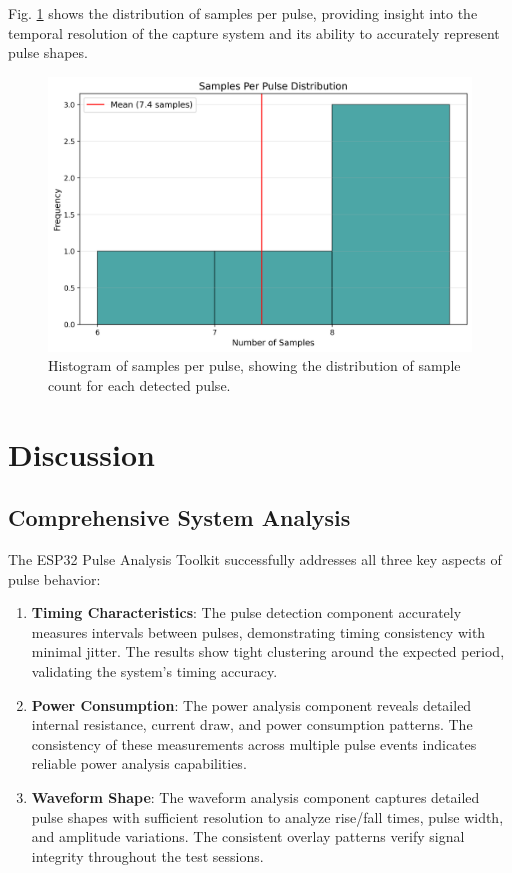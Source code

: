 \documentclass[conference]{IEEEtran}
\begin{document}
Fig. \ref{fig:waveform_samples_hist} shows the distribution of samples per pulse, providing insight into the temporal resolution of the capture system and its ability to accurately represent pulse shapes.

\begin{figure}[htbp]
    \centering
    \includegraphics[width=\linewidth]{data/waveform_session_2025-05-09_1445/plots/waveform_samples_hist.png}
    \caption{Histogram of samples per pulse, showing the distribution of sample count for each detected pulse.}
    \label{fig:waveform_samples_hist}
\end{figure}

\section{Discussion}

\subsection{Comprehensive System Analysis}
The ESP32 Pulse Analysis Toolkit successfully addresses all three key aspects of pulse behavior:

\begin{enumerate}
    \item \textbf{Timing Characteristics}: The pulse detection component accurately measures intervals between pulses, demonstrating timing consistency with minimal jitter. The results show tight clustering around the expected period, validating the system's timing accuracy.
    
    \item \textbf{Power Consumption}: The power analysis component reveals detailed internal resistance, current draw, and power consumption patterns. The consistency of these measurements across multiple pulse events indicates reliable power analysis capabilities.
    
    \item \textbf{Waveform Shape}: The waveform analysis component captures detailed pulse shapes with sufficient resolution to analyze rise/fall times, pulse width, and amplitude variations. The consistent overlay patterns verify signal integrity throughout the test sessions.
\end{enumerate}
\end{document}
